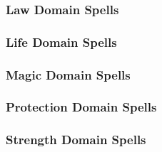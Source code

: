 \subsubsection{Law Domain Spells}

\begin{spelllist}
    \SLprotectionfromalignment[1]
    \SLdiscernlies[2]
    \SLorderswrath[3]
    \SLmarkofscrying[4]
    \SLdictum[5]
    \SLprohibition[6]
    \SLavataroffealty[7]
    \SLimprisonment[8]
    \SLavataroforder[9]
\end{spelllist}

\subsubsection{Life Domain Spells}

\begin{spelllist}
    \SLcurewounds[1]
    \SLsharepain[2]
    \SLrestoration[3]
    \SLavatarofhealing[4]
    \SLrevivify[5]
    \SLheal[6]
    \SLdivineshield[7]
    \SLlifebound[8]
    \SLavataroflife[9]
\end{spelllist}

\subsubsection{Magic Domain Spells}

\begin{spelllist}
    \SLmagicmissile[1]
    \SLdimensionalanchor[2]
    \SLdispelmagic[3]
    \SLmissilestorm[4]
    \SLavatarofmissiles[5]
    \SLspellsight[6]
    \SLantimagicfield[7]
    \SLsevermagic[8]
    \SLdisjoinmagic[9]
\end{spelllist}

\subsubsection{Protection Domain Spells}

\begin{spelllist}
    \SLsanctuary[1]
    \SLsharepain[2]
    \SLresistmagic[3]
    \SLdeathward[4]
    \SLdeflection[5]
    \SLauraofimmunity[6]
    \SLavatarofshielding[7]
    \SLmartyrsgift[8]
    \SLshadowshield[9]
\end{spelllist}

\subsubsection{Strength Domain Spells}

